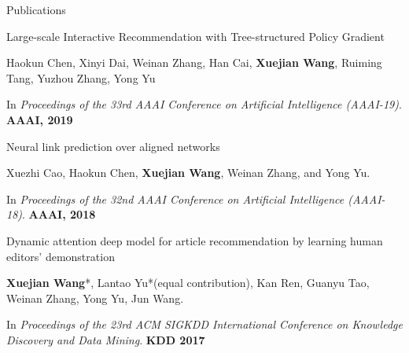 \documentclass{resume} %
\begin{document}
\begin{rSection}{Publications}
\begin{rSubsection}{Large-scale Interactive Recommendation with Tree-structured Policy Gradient}{}{}{}
\item Haokun Chen, Xinyi Dai, Weinan Zhang, Han Cai, \textbf{Xuejian Wang}, Ruiming Tang, Yuzhou Zhang, Yong Yu
\item In \emph{Proceedings of the 33rd AAAI Conference on Artificial Intelligence (AAAI-19)}. \textbf{AAAI, 2019}
\end{rSubsection}
\vspace{-2pt}
\begin{rSubsection}{Neural link prediction over aligned networks}{}{}{}
\item Xuezhi Cao, Haokun Chen, \textbf{Xuejian Wang}, Weinan Zhang, and Yong Yu.
\item In \emph{Proceedings of the 32nd AAAI Conference on Artificial Intelligence (AAAI-18)}. \textbf{AAAI, 2018}
\end{rSubsection}
\vspace{-2pt}
\begin{rSubsection}{Dynamic attention deep model for article recommendation by learning human editors' demonstration}{}{}{}
\item \textbf{Xuejian Wang}*, Lantao Yu*(equal contribution), Kan Ren, Guanyu Tao, Weinan Zhang, Yong Yu, Jun Wang.
\item In \emph{Proceedings of the 23rd ACM SIGKDD International Conference on Knowledge Discovery and Data Mining}. \textbf{KDD 2017}
\end{rSubsection}
\end{rSection}
\end{document}
